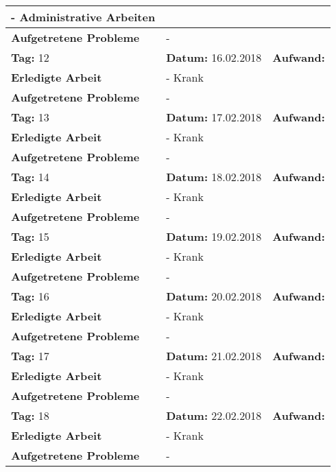 \begin{longtable}{|p{5cm}|p{5cm}|p{6cm}|}
{- Administrative Arbeiten} \\ \hline
\textbf{Aufgetretene Probleme} & \multicolumn{2}{p{11cm}|}{-} \\ \hline
\rowcolor{heading}\textbf{Tag:} 12 & \textbf{Datum:} 16.02.2018 & \textbf{Aufwand:} \\ \hline
\textbf{Erledigte Arbeit} & \multicolumn{2}{p{11cm}|}{- Krank} \\ \hline
\textbf{Aufgetretene Probleme} & \multicolumn{2}{p{11cm}|}{-} \\ \hline
\rowcolor{heading}\textbf{Tag:} 13 & \textbf{Datum:} 17.02.2018 & \textbf{Aufwand:} \\ \hline
\textbf{Erledigte Arbeit} & \multicolumn{2}{p{11cm}|}{- Krank} \\ \hline
\textbf{Aufgetretene Probleme} & \multicolumn{2}{p{11cm}|}{-} \\ \hline
\rowcolor{heading}\textbf{Tag:} 14 & \textbf{Datum:} 18.02.2018 & \textbf{Aufwand:} \\ \hline
\textbf{Erledigte Arbeit} & \multicolumn{2}{p{11cm}|}{- Krank} \\ \hline
\textbf{Aufgetretene Probleme} & \multicolumn{2}{p{11cm}|}{-} \\ \hline
\rowcolor{heading}\textbf{Tag:} 15 & \textbf{Datum:} 19.02.2018 & \textbf{Aufwand:} \\ \hline
\textbf{Erledigte Arbeit} & \multicolumn{2}{p{11cm}|}{- Krank} \\ \hline
\textbf{Aufgetretene Probleme} & \multicolumn{2}{p{11cm}|}{-} \\ \hline
\rowcolor{heading}\textbf{Tag:} 16 & \textbf{Datum:} 20.02.2018 & \textbf{Aufwand:} \\ \hline
\textbf{Erledigte Arbeit} & \multicolumn{2}{p{11cm}|}{- Krank} \\ \hline
\textbf{Aufgetretene Probleme} & \multicolumn{2}{p{11cm}|}{-} \\ \hline
\rowcolor{heading}\textbf{Tag:} 17 & \textbf{Datum:} 21.02.2018 & \textbf{Aufwand:} \\ \hline
\textbf{Erledigte Arbeit} & \multicolumn{2}{p{11cm}|}{- Krank} \\ \hline
\textbf{Aufgetretene Probleme} & \multicolumn{2}{p{11cm}|}{-} \\ \hline
\rowcolor{heading}\textbf{Tag:} 18 & \textbf{Datum:} 22.02.2018 & \textbf{Aufwand:} \\ \hline
\textbf{Erledigte Arbeit} & \multicolumn{2}{p{11cm}|}{- Krank} \\ \hline
\textbf{Aufgetretene Probleme} & \multicolumn{2}{p{11cm}|}{-} \\ \hline

\end{longtable}
